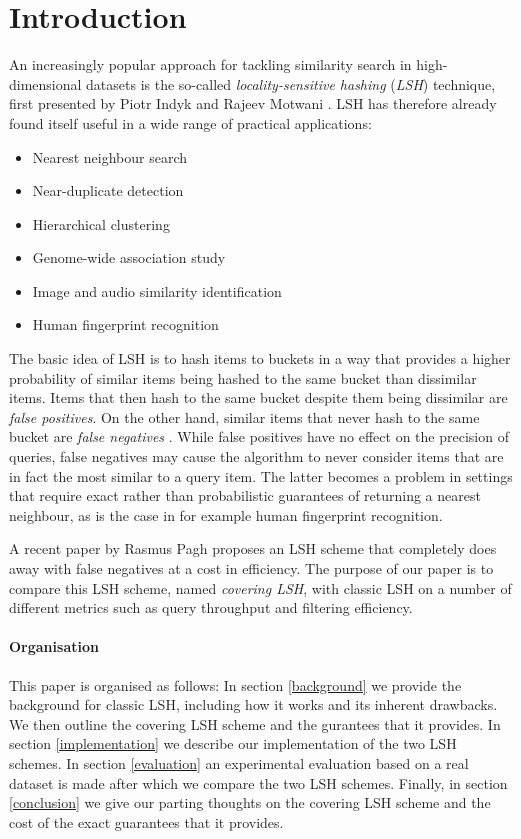 \section{Introduction}
\label{introduction}

An increasingly popular approach for tackling similarity search in high-dimensional datasets is the so-called \textit{locality-sensitive hashing} (\textit{LSH}) technique, first presented by Piotr Indyk and Rajeev Motwani \cite{DBLP:conf/stoc/IndykM98}. LSH has therefore already found itself useful in a wide range of practical applications:

\begin{itemize}
  \item Nearest neighbour search
  \item Near-duplicate detection
  \item Hierarchical clustering
  \item Genome-wide association study
  \item Image and audio similarity identification
  \item Human fingerprint recognition
\end{itemize}

The basic idea of LSH is to hash items to buckets in a way that provides a higher probability of similar items being hashed to the same bucket than dissimilar items. Items that then hash to the same bucket despite them being dissimilar are \textit{false positives}. On the other hand, similar items that never hash to the same bucket are \textit{false negatives} \cite[p. 88]{DBLP:books/cu/LeskovecRU14}. While false positives have no effect on the precision of queries, false negatives may cause the algorithm to never consider items that are in fact the most similar to a query item. The latter becomes a problem in settings that require exact rather than probabilistic guarantees of returning a nearest neighbour, as is the case in for example human fingerprint recognition.

A recent paper by Rasmus Pagh \cite{DBLP:journals/corr/Pagh15} proposes an LSH scheme that completely does away with false negatives at a cost in efficiency. The purpose of our paper is to compare this LSH scheme, named \textit{covering LSH}, with classic LSH on a number of different metrics such as query throughput and filtering efficiency.

\paragraph{Organisation} This paper is organised as follows: In section \ref{background} we provide the background for classic LSH, including how it works and its inherent drawbacks. We then outline the covering LSH scheme and the gurantees that it provides. In section \ref{implementation} we describe our implementation of the two LSH schemes. In section \ref{evaluation} an experimental evaluation based on a real dataset is made after which we compare the two LSH schemes. Finally, in section \ref{conclusion} we give our parting thoughts on the covering LSH scheme and the cost of the exact guarantees that it provides.
